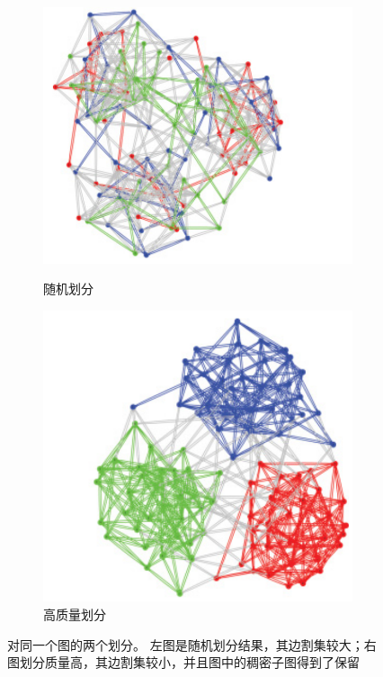 \documentclass[master]{njuthesis}
\begin{document}
\begin{figure}[h]
\centering
\begin{subfigure}[b]{0.45\textwidth}
	\center	\includegraphics[width=1\textwidth]{figure/partition_a.png}
	\label{fig:p_1}
	\caption{随机划分}
\end{subfigure}
\begin{subfigure}[b]{0.45\textwidth}
	\centering
	\includegraphics[width=1\textwidth]{figure/partition_b.png}
	\caption{高质量划分}
	\label{fig:p_2}
\end{subfigure}
\caption{对同一个图的两个划分。 左图是随机划分结果，其边割集较大；右图划分质量高，其边割集较小，并且图中的稠密子图得到了保留}
\label{fig:partition}
\end{figure}
\end{document}
